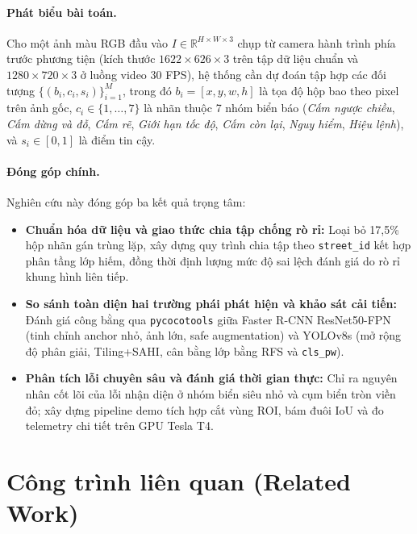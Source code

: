 \documentclass[11pt]{article}
\begin{document}
\paragraph{Phát biểu bài toán.}
Cho một ảnh màu RGB đầu vào $I \in \mathbb{R}^{H \times W \times 3}$ chụp từ camera hành trình phía trước phương tiện (kích thước $1622 \times 626 \times 3$ trên tập dữ liệu chuẩn và $1280 \times 720 \times 3$ ở luồng video 30 FPS), hệ thống cần dự đoán tập hợp các đối tượng $\{(b_i, c_i, s_i)\}_{i=1}^{M}$, trong đó $b_i = [x, y, w, h]$ là tọa độ hộp bao theo pixel trên ảnh gốc, $c_i \in \{1, \dots, 7\}$ là nhãn thuộc 7 nhóm biển báo (\textit{Cấm ngược chiều}, \textit{Cấm dừng và đỗ}, \textit{Cấm rẽ}, \textit{Giới hạn tốc độ}, \textit{Cấm còn lại}, \textit{Nguy hiểm}, \textit{Hiệu lệnh}), và $s_i \in [0, 1]$ là điểm tin cậy.

\paragraph{Đóng góp chính.}
Nghiên cứu này đóng góp ba kết quả trọng tâm:
\begin{itemize}
\itemsep0pt
\item \textbf{Chuẩn hóa dữ liệu và giao thức chia tập chống rò rỉ:} Loại bỏ 17,5\% hộp nhãn gán trùng lặp, xây dựng quy trình chia tập theo \texttt{street\_id} kết hợp phân tầng lớp hiếm, đồng thời định lượng mức độ sai lệch đánh giá do rò rỉ khung hình liên tiếp.
\item \textbf{So sánh toàn diện hai trường phái phát hiện và khảo sát cải tiến:} Đánh giá công bằng qua \texttt{pycocotools} giữa Faster R-CNN ResNet50-FPN (tinh chỉnh anchor nhỏ, ảnh lớn, safe augmentation) và YOLOv8s (mở rộng độ phân giải, Tiling+SAHI, cân bằng lớp bằng RFS và \texttt{cls\_pw}).
\item \textbf{Phân tích lỗi chuyên sâu và đánh giá thời gian thực:} Chỉ ra nguyên nhân cốt lõi của lỗi nhận diện ở nhóm biển siêu nhỏ và cụm biển tròn viền đỏ; xây dựng pipeline demo tích hợp cắt vùng ROI, bám đuôi IoU và đo telemetry chi tiết trên GPU Tesla T4.
\end{itemize}


\section{Công trình liên quan (Related Work)}
\end{document}
